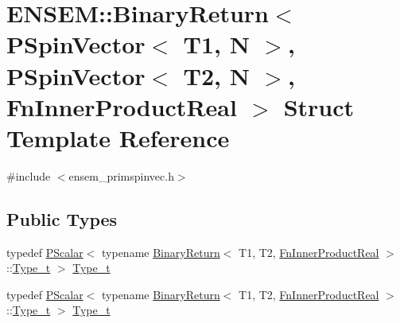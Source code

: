 \hypertarget{structENSEM_1_1BinaryReturn_3_01PSpinVector_3_01T1_00_01N_01_4_00_01PSpinVector_3_01T2_00_01N_01_4_00_01FnInnerProductReal_01_4}{}\section{E\+N\+S\+EM\+:\+:Binary\+Return$<$ P\+Spin\+Vector$<$ T1, N $>$, P\+Spin\+Vector$<$ T2, N $>$, Fn\+Inner\+Product\+Real $>$ Struct Template Reference}
\label{structENSEM_1_1BinaryReturn_3_01PSpinVector_3_01T1_00_01N_01_4_00_01PSpinVector_3_01T2_00_01N_01_4_00_01FnInnerProductReal_01_4}


{\ttfamily \#include $<$ensem\+\_\+primspinvec.\+h$>$}

\subsection*{Public Types}
\begin{DoxyCompactItemize}
\item 
typedef \mbox{\hyperlink{classENSEM_1_1PScalar}{P\+Scalar}}$<$ typename \mbox{\hyperlink{structENSEM_1_1BinaryReturn}{Binary\+Return}}$<$ T1, T2, \mbox{\hyperlink{structENSEM_1_1FnInnerProductReal}{Fn\+Inner\+Product\+Real}} $>$\+::\mbox{\hyperlink{structENSEM_1_1BinaryReturn_3_01PSpinVector_3_01T1_00_01N_01_4_00_01PSpinVector_3_01T2_00_01N_01_4_00_01FnInnerProductReal_01_4_aa5f2db16692ec046a61e1b2b044a2790}{Type\+\_\+t}} $>$ \mbox{\hyperlink{structENSEM_1_1BinaryReturn_3_01PSpinVector_3_01T1_00_01N_01_4_00_01PSpinVector_3_01T2_00_01N_01_4_00_01FnInnerProductReal_01_4_aa5f2db16692ec046a61e1b2b044a2790}{Type\+\_\+t}}
\item 
typedef \mbox{\hyperlink{classENSEM_1_1PScalar}{P\+Scalar}}$<$ typename \mbox{\hyperlink{structENSEM_1_1BinaryReturn}{Binary\+Return}}$<$ T1, T2, \mbox{\hyperlink{structENSEM_1_1FnInnerProductReal}{Fn\+Inner\+Product\+Real}} $>$\+::\mbox{\hyperlink{structENSEM_1_1BinaryReturn_3_01PSpinVector_3_01T1_00_01N_01_4_00_01PSpinVector_3_01T2_00_01N_01_4_00_01FnInnerProductReal_01_4_aa5f2db16692ec046a61e1b2b044a2790}{Type\+\_\+t}} $>$ \mbox{\hyperlink{structENSEM_1_1BinaryReturn_3_01PSpinVector_3_01T1_00_01N_01_4_00_01PSpinVector_3_01T2_00_01N_01_4_00_01FnInnerProductReal_01_4_aa5f2db16692ec046a61e1b2b044a2790}{Type\+\_\+t}}
\end{DoxyCompactItemize}


